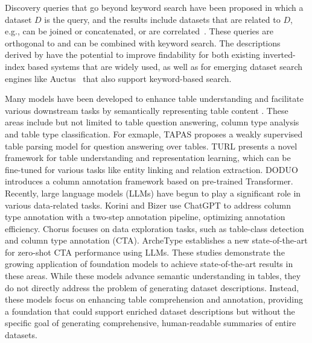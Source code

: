 Discovery queries that go beyond keyword search have been proposed in which a dataset $D$ is the query, and the results include datasets that are related to $D$, e.g., can be joined or concatenated, or are correlated~\cite{lazo@icde2019,josie@sigmod2019,santos23,santos2021correlation}. These queries are orthogonal to and  can be combined with keyword search.
%
The descriptions derived by \SystemName have the potential to improve findability for both existing inverted-index based systems that are widely used, as well as for emerging dataset search engines like Auctus~\cite{castelo2021auctus} that also support keyword-based search.
% 

Many models have been developed to enhance table understanding and facilitate various downstream tasks by semantically representing table content \cite{hulsebos2019sherlock, wang2021tcn, zhang2019sato, deng2022turl, archetype@vldb2024, herzig2020tapas, chorus@vldb2024, korini2023columnGPT, liu2021tapex, suhara2022doduo, yin2020tabert, wang2021tuta, iida2021tabbie}. 
% 
These areas include but not limited to table question answering, column type analysis and table type classification.
% 
For exmaple, TAPAS \cite{herzig2020tapas} proposes a weakly supervised table parsing model for question answering over tables.
% 
TURL \cite{deng2022turl} presents a novel framework for table understanding and representation learning, which can be fine-tuned for various tasks like entity linking and relation extraction.
% 
DODUO \cite{suhara2022doduo} introduces a column annotation framework based on pre-trained Transformer.
% 
Recently, large language models (LLMs) have begun to play a significant role in various data-related tasks.
% 
Korini and Bizer \cite{korini2023columnGPT} use ChatGPT to address column type annotation with a two-step annotation pipeline, optimizing annotation efficiency. Chorus \cite{chorus@vldb2024} focuses on data exploration tasks, such as table-class detection and column type annotation (CTA). ArcheType \cite{ archetype@vldb2024} establishes a new state-of-the-art for zero-shot CTA performance using LLMs.
% 
These studies demonstrate the growing application of foundation models to achieve state-of-the-art results in these areas.
% 
While these models advance semantic understanding in tables, they do not directly address the problem of generating dataset descriptions. Instead, these models focus on enhancing table comprehension and annotation, providing a foundation that could support enriched dataset descriptions but without the specific goal of generating comprehensive, human-readable summaries of entire datasets.

